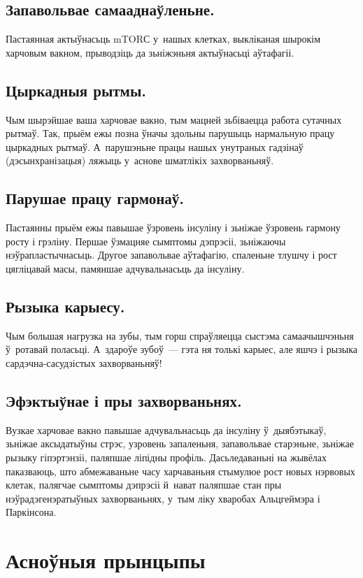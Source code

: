 \subsection{Запавольвае самааднаўленьне.}\!
Пастаянная актыўнасьць mTORС у~нашых клетках, выкліканая шырокім харчовым вакном, прыводзіць да зьніжэньня актыўнасьці аўтафагіі.

\subsection{Цыркадныя рытмы.}
Чым шырэйшае ваша харчовае вакно, тым мацней зьбіваецца работа сутачных рытмаў. Так, прыём ежы позна ўначы здольны парушыць нармальную працу цыркадных рытмаў. А~парушэньне працы нашых унутраных гадзінаў (дэсынхранізацыя) ляжыць у~аснове шматлікіх захворваньняў.

\subsection{Парушае працу гармонаў.}
Пастаянны прыём ежы павышае ўзровень інсуліну і зьніжае ўзровень гармону росту і грэліну. Першае ўзмацняе сымптомы дэпрэсіі, зьніжаючы нэўрапластычнасьць. Другое запавольвае аўтафагію, спаленьне тлушчу і рост цягліцавай масы, памяншае адчувальнасьць да інсуліну.

\subsection{Рызыка карыесу.}
Чым большая нагрузка на зубы, тым горш спраўляецца сыстэма самаачышчэньня ў~ротавай поласьці. А~здароўе зубоў~--- гэта ня толькі карыес, але яшчэ і рызыка сардэчна-сасудзістых захворваньняў!

\subsection{Эфэктыўнае і пры захворваньнях.}
Вузкае харчовае вакно павышае адчувальнасьць да інсуліну ў~дыябэтыкаў, зьніжае аксыдатыўны стрэс, узровень запаленьня, запавольвае старэньне, зьніжае рызыку гіпэртэнзіі, паляпшае ліпідны профіль. Дасьледаваньні на жывёлах паказваюць, што абмежаваньне часу харчаваньня стымулюе рост новых нэрвовых клетак, палягчае сымптомы дэпрэсіі й~нават паляпшае стан пры нэўрадэгенэратыўных захворваньнях, у~тым ліку хваробах Альцгеймэра і Паркінсона.

\section{Асноўныя прынцыпы}

